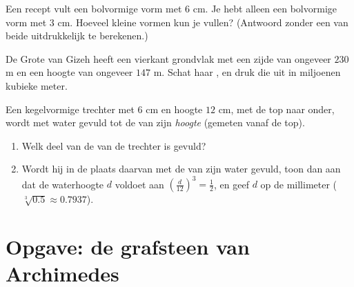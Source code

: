 \begin{exercise}[$\star\star$]\label{exo:g9:solids:7}
Een recept vult een bolvormige vorm met  $6$ cm. Je hebt alleen een
bolvormige vorm met  $3$ cm. Hoeveel kleine vormen kun je vullen? (Antwoord
zonder een van beide  uitdrukkelijk te berekenen.)
\end{exercise}

\begin{exercise}[$\star\star$]\label{exo:g9:solids:8}
De Grote  van Gizeh heeft een vierkant grondvlak met een zijde van ongeveer
$230$ m en een hoogte van ongeveer $147$ m. Schat haar , en druk die uit in
miljoenen kubieke meter.
\end{exercise}

\begin{exercise}[$\star\star\star$]\label{exo:g9:solids:9}
Een kegelvormige trechter met  $6$ cm en hoogte $12$ cm, met de top naar
onder, wordt met water gevuld tot de  van zijn \emph{hoogte} (gemeten vanaf de
top).
\begin{enumerate}
  \item Welk deel van de  van de trechter is gevuld?
  \item Wordt hij in de plaats daarvan met de  van zijn \emph{} water
        gevuld, toon dan aan dat de waterhoogte $d$ voldoet aan
        $\left(\frac{d}{12}\right)^3 = \frac12$, en geef $d$ op de millimeter
        ($\sqrt[3]{0.5} \approx 0.7937$).
\end{enumerate}
\end{exercise}

\section{Opgave: de grafsteen van Archimedes}

